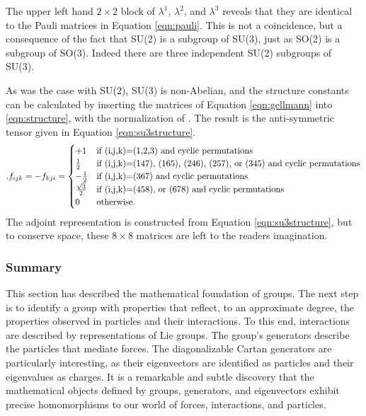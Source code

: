 The upper left hand $2\times2$ block of $\lambda^1$, $\lambda^2$, and $\lambda^3$ reveals that they are identical to the Pauli matrices in Equation \ref{eqn:pauli}.
This is not a coincidence, but a consequence of the fact that SU(2) is a subgroup of SU(3), just as SO(2) is a subgroup of SO(3).
Indeed there are three independent SU(2) subgroups of SU(3).

As was the case with SU(2), SU(3) is non-Abelian, and the structure constants can be calculated by inserting the matrices of Equation \ref{eqn:gellmann} into \ref{eqn:structure}, with the normalization of \half. 
The result is the anti-symmetric tensor given in Equation \ref{eqn:su3structure}. \check
\begin{equation}
\begin{split}\label{eqn:su3structure}.
f_{ijk} =-f_{kji}= \begin{cases}
+1 &\text{if (i,j,k)=(1,2,3) and cyclic permutations}\\
\frac{1}{2} &\text{if (i,j,k)=(147), (165), (246), (257), or (345) and cyclic permutations}\\
-\frac{1}{2} &\text{if (i,j,k)=(367) and cyclic permutations}\\
\frac{\sqrt{3}}{2} &\text{if (i,j,k)=(458), or (678) and cyclic permutations}\\
0 &\text{otherwise.}
\end{cases} 
\end{split}
\end{equation} 
The adjoint representation is constructed from Equation \ref{eqn:su3structure}, but to conserve space, these $8\times8$ matrices are left to the readers imagination.

\subsubsection{Summary}

This section has described the mathematical foundation of groups.
The next step is to identify a group with properties that reflect, to an approximate degree, the properties observed in particles and their interactions.
To this end, interactions are described by representations of Lie groups.
The group's generators describe the particles that mediate forces.
The diagonalizable Cartan generators are particularly interesting, as their eigenvectors are identified as particles and their eigenvalues as charges.
It is a remarkable and subtle discovery that the mathematical objects defined by groups, generators, and eigenvectors exhibit precise homomorphisms to our world of forces, interactions, and particles.
\cite{robinson}



